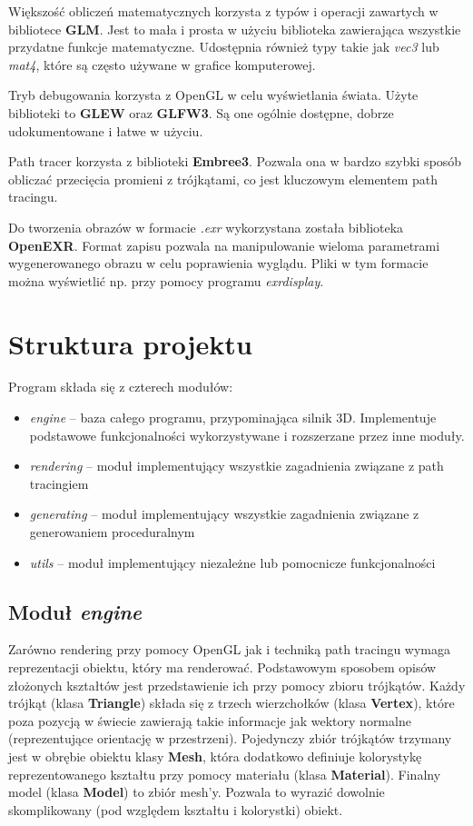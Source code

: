 \documentclass[inz,shortabstract]{iithesis}
\begin{document}
        Większość obliczeń matematycznych korzysta z typów i operacji zawartych w bibliotece \textbf{GLM}. Jest to mała i prosta w użyciu biblioteka zawierająca wszystkie przydatne funkcje matematyczne. Udostępnia również typy takie jak \textit{vec3} lub \textit{mat4}, które są często używane w grafice komputerowej. 
        
        Tryb debugowania korzysta z OpenGL w celu wyświetlania świata. Użyte biblioteki to \textbf{GLEW} oraz \textbf{GLFW3}. Są one ogólnie dostępne, dobrze udokumentowane i łatwe w użyciu. 
        
        Path tracer korzysta z biblioteki \textbf{Embree3}. Pozwala ona w bardzo szybki sposób obliczać przecięcia promieni z trójkątami, co jest kluczowym elementem path tracingu. 
        
        Do tworzenia obrazów w formacie \textit{.exr} wykorzystana została biblioteka \textbf{OpenEXR}. Format zapisu pozwala na manipulowanie wieloma parametrami wygenerowanego obrazu w celu poprawienia wyglądu. 
        Pliki w tym formacie można wyświetlić np. przy pomocy programu \textit{exrdisplay}.
        
    \section{Struktura projektu}
        Program składa się z czterech modułów:
        \begin{itemize}
            \item \textit{engine} -- baza całego programu, przypominająca silnik 3D. Implementuje podstawowe funkcjonalności wykorzystywane i rozszerzane przez inne moduły. 
            \item \textit{rendering} -- moduł implementujący wszystkie zagadnienia związane z path tracingiem
            \item \textit{generating} -- moduł implementujący wszystkie zagadnienia związane z generowaniem proceduralnym
            \item \textit{utils} -- moduł implementujący niezależne lub pomocnicze funkcjonalności
        \end{itemize}
        
        \subsection{Moduł \textit{engine}}
            Zarówno rendering przy pomocy OpenGL jak i techniką path tracingu wymaga reprezentacji obiektu, który ma renderować. Podstawowym sposobem opisów złożonych kształtów jest przedstawienie ich przy pomocy zbioru trójkątów. Każdy trójkąt (klasa \textbf{Triangle}) składa się z trzech wierzchołków (klasa \textbf{Vertex}), które poza pozycją w świecie zawierają takie informacje jak wektory normalne (reprezentujące orientację w przestrzeni). Pojedynczy zbiór trójkątów trzymany jest w obrębie obiektu klasy \textbf{Mesh}, która dodatkowo definiuje kolorystykę reprezentowanego kształtu przy pomocy materiału (klasa \textbf{Material}). Finalny model (klasa \textbf{Model}) to zbiór mesh'y. Pozwala to wyrazić dowolnie skomplikowany (pod względem kształtu i kolorystki) obiekt. 
            
\end{document}
